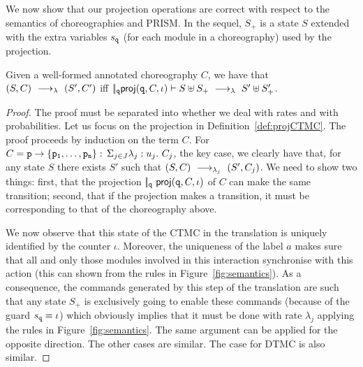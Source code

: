 \smallskip

 We now show that our projection operations are
correct with respect to the semantics of choreographies and PRISM. In
the sequel, $S_+$ is a state $S$ extended with the extra variables
$s_{\mathtt{q}}$ (for each module in a choreography) used by the
projection. 
\begin{theorem}[EPP]\label{thm:epp}
  Given a well-formed annotated choreography $C$, we have that
  $(S,C) \ \longrightarrow_{\lambda}\  (S', C')$ iff
  $|\!|_{\mathtt{q}}\mathsf{proj} (\mathtt{q}, C,\iota)\vdash S\uplus
  S_{+}\ \longrightarrow_{\lambda}\  S'\uplus S_{+}'$.
\end{theorem}
\begin{proof} The proof must be separated into whether we deal with
  rates and with probabilities. Let us focus on the projection in
  Definition~\ref{def:projCTMC}. The proof proceeds by induction on
  the term $C$. For $C=\mathtt{p}\rightarrow \{\mathtt{\mathtt{p}_1,\ldots,\mathtt{p}_n}\}:\,\Sigma_{j\in J}\lambda_j: u_j.\ C_j$, the
  key case, we clearly have that, for any state $S$ there exists $S'$
  such that $(S,C)\ \longrightarrow_{\lambda_j}\ (S',C_j)$. We need to show two
  things: first, that the projection
  $|\!|_{\mathtt{q}}\ \mathsf{proj}{(\mathtt{q},C,\iota)}$ of $C$ can make the same
  transition; second, that if the projection makes a transition, it
  must be corresponding to that of the choreography above.

  We now observe that this state of the CTMC in the translation is
  uniquely identified by the counter $\iota$. 
  Moreover, the uniqueness of the label $a$ makes sure that all and
  only those modules involved in this interaction synchronise with
  this action (this can shown from the rules in
  Figure~\ref{fig:semantics}).  As a consequence, the commands
  generated by this step of the translation are such that any state
  $S_+$ is exclusively going to enable these commands (because of the
  guard $s_{\mathtt{q}}=\iota$) which obviously implies that it must be
  done with rate $\lambda_j$ applying the rules in
  Figure~\ref{fig:semantics}. The same argument can be applied for the
  opposite direction. 
  The other cases are similar. The case for DTMC is also similar.




\end{proof}

